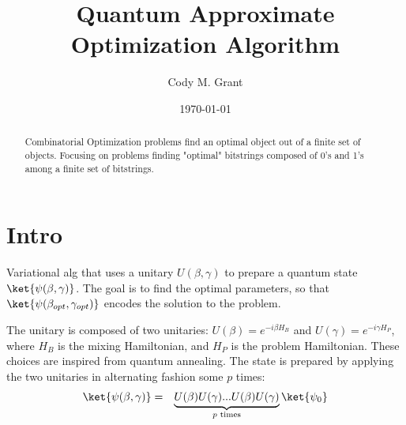 \documentclass[preprint,aps,prd,nofootinbib,superscriptaddress]{revtex4-2}
\begin{document}
\title{\boldmath Quantum Approximate Optimization Algorithm}


\author{Cody M. Grant}


\date{\today}

\begin{abstract}

Combinatorial Optimization problems find an optimal object out of a finite set of objects. Focusing on problems finding "optimal" bitstrings composed of 0's and 1's among a finite set of bitstrings.

\end{abstract}

%
\maketitle
\newpage


\section{Intro}
%
Variational alg that uses a unitary $U(\beta, \gamma)$ to prepare a quantum state $\ket{\psi(\beta, \gamma)}$. The goal is to find the optimal parameters, so that $\ket{\psi(\beta_{opt}, \gamma_{opt})}$ encodes the solution to the problem.
%

%
The unitary is composed of two unitaries: $U(\beta)= e^{-i \beta H_B}$ and $U(\gamma)= e^{-i \gamma H_P}$, where $H_B$ is the mixing Hamiltonian, and $H_P$ is the problem Hamiltonian. These choices are inspired from quantum annealing. The state is prepared by applying the two unitaries in alternating fashion some $p$ times:
%
\begin{eqnarray}
\ket{\psi(\beta, \gamma)} &=& 
\underbrace{U(\beta) U(\gamma)...U(\beta) U(\gamma)}_{p \text{ times}} \ket{\psi_0}
\end{eqnarray}
%

\end{document}

